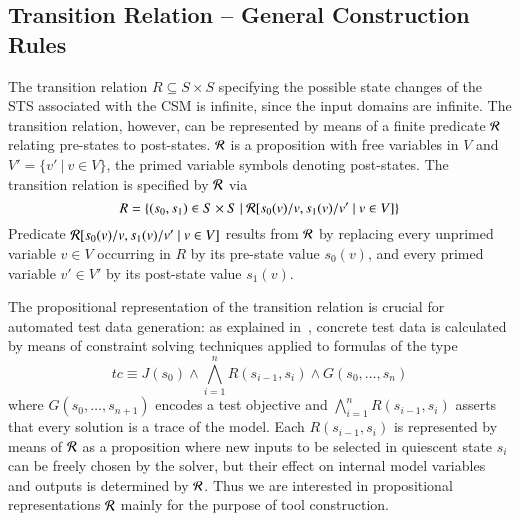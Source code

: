 %


\subsection{Transition Relation -- General Construction Rules}

The transition relation $R\subseteq S\times S$ 
specifying the possible state changes of the STS associated with the CSM   is  infinite, since the
input domains are infinite. 
The transition relation, however, can be represented by means of a 
finite predicate ${\cal R}$
relating pre-states to post-states. ${\cal R}$ is a proposition with free variables in $V$ and $V' = \{v'~|~v\in V\}$, the primed variable symbols denoting post-states. The transition relation is specified by ${\cal R}$ via
$$
R  =  \{ (s_0,s_1)\in S\times S~|~{\cal R}[s_0(v)/v,s_1(v)/v'~|~v\in V]\}
$$
Predicate ${\cal R}[s_0(v)/v,s_1(v)/v'~|~v\in V]$ results from ${\cal R}$ by replacing every unprimed variable $v\in V$ occurring in $R$ 
by its pre-state value $s_0(v)$, and every primed variable $v'\in V'$ by its post-state value $s_1(v)$.

The propositional representation of the transition relation is crucial for automated test data generation: as explained in~\cite{EPTCS111.1}, concrete test data is calculated by means of constraint solving techniques applied to formulas of the type
$$
tc \equiv J(s_0) \wedge \bigwedge_{i=1}^n R(s_{i-1},s_i) \wedge
G(s_0,\ldots,s_n)
$$
where $G(s_0,\ldots,s_{n+1})$ encodes a test objective and $\bigwedge_{i=1}^n R(s_{i-1},s_i)$ asserts that every solution is a trace of the model. Each $R(s_{i-1},s_i)$ is represented by means
of ${\cal R}$ as a proposition where new inputs to be selected in quiescent state $s_i$ can be freely chosen by the solver, but their effect on internal model variables and outputs is determined by ${\cal R}$. Thus we are interested in propositional representations ${\cal R}$ mainly for the purpose of tool construction.

